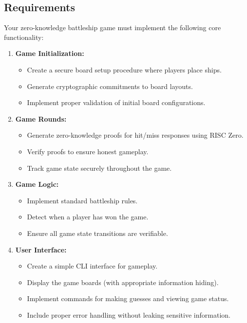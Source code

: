 \documentclass[10pt,a4paper,american]{exam}
\begin{document}
\subsection*{Requirements}
Your zero-knowledge battleship game must implement the following core functionality:

\begin{enumerate}
	\item \textbf{Game Initialization:}
	      \begin{itemize}
		      \item Create a secure board setup procedure where players place ships.
		      \item Generate cryptographic commitments to board layouts.
		      \item Implement proper validation of initial board configurations.
	      \end{itemize}

	\item \textbf{Game Rounds:}
	      \begin{itemize}
		      \item Generate zero-knowledge proofs for hit/miss responses using RISC Zero.
		      \item Verify proofs to ensure honest gameplay.
		      \item Track game state securely throughout the game.
	      \end{itemize}

	\item \textbf{Game Logic:}
	      \begin{itemize}
		      \item Implement standard battleship rules.
		      \item Detect when a player has won the game.
		      \item Ensure all game state transitions are verifiable.
	      \end{itemize}

	\item \textbf{User Interface:}
	      \begin{itemize}
		      \item Create a simple CLI interface for gameplay.
		      \item Display the game boards (with appropriate information hiding).
		      \item Implement commands for making guesses and viewing game status.
		      \item Include proper error handling without leaking sensitive information.
	      \end{itemize}
\end{enumerate}
\end{document}
